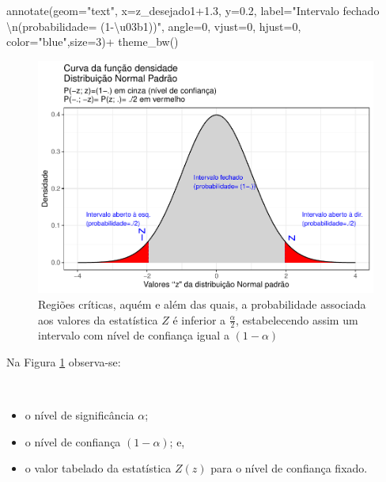 \documentclass[
]{book}
\newenvironment{Shaded}{\begin{snugshade}}{\end{snugshade}}
\newcommand{\AttributeTok}[1]{\textcolor[rgb]{0.77,0.63,0.00}{#1}}
\newcommand{\DecValTok}[1]{\textcolor[rgb]{0.00,0.00,0.81}{#1}}
\newcommand{\FloatTok}[1]{\textcolor[rgb]{0.00,0.00,0.81}{#1}}
\newcommand{\FunctionTok}[1]{\textcolor[rgb]{0.00,0.00,0.00}{#1}}
\newcommand{\NormalTok}[1]{#1}
\newcommand{\SpecialCharTok}[1]{\textcolor[rgb]{0.00,0.00,0.00}{#1}}
\newcommand{\StringTok}[1]{\textcolor[rgb]{0.31,0.60,0.02}{#1}}
\providecommand{\tightlist}{%
  \setlength{\itemsep}{0pt}\setlength{\parskip}{0pt}}
\begin{document}
\begin{Shaded}
\begin{Highlighting}[]
  \FunctionTok{annotate}\NormalTok{(}\AttributeTok{geom=}\StringTok{"text"}\NormalTok{, }\AttributeTok{x=}\NormalTok{z\_desejado1}\FloatTok{+1.3}\NormalTok{, }\AttributeTok{y=}\FloatTok{0.2}\NormalTok{, }\AttributeTok{label=}\StringTok{"Intervalo fechado }\SpecialCharTok{\textbackslash{}n}\StringTok{(probabilidade= (1{-}\textbackslash{}u03b1))"}\NormalTok{, }\AttributeTok{angle=}\DecValTok{0}\NormalTok{, }\AttributeTok{vjust=}\DecValTok{0}\NormalTok{, }\AttributeTok{hjust=}\DecValTok{0}\NormalTok{, }\AttributeTok{color=}\StringTok{"blue"}\NormalTok{,}\AttributeTok{size=}\DecValTok{3}\NormalTok{)}\SpecialCharTok{+}
  \FunctionTok{theme\_bw}\NormalTok{()}
\end{Highlighting}
\end{Shaded}

\begin{figure}

{\centering \includegraphics[width=1\linewidth]{apostila_files/figure-latex/fig61-1} 

}

\caption{Regiões críticas, aquém e além das quais, a probabilidade associada aos valores da estatística $Z$ é inferior a $\frac{\alpha}{2}$, estabelecendo assim um intervalo com nível de confiança igual a $(1-\alpha)$}\label{fig:fig61}
\end{figure}

\hfill\break

Na Figura \ref{fig:fig61} observa-se:

~

\begin{itemize}
\tightlist
\item
  o nível de significância \(\alpha\);\\
\item
  o nível de confiança \((1-\alpha)\); e,\\
\item
  o valor tabelado da estatística \(Z(z)\) para o nível de confiança fixado.
\end{itemize}
\end{document}
